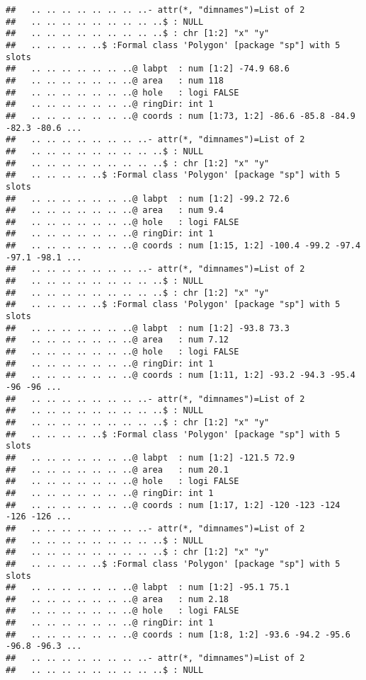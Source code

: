 \documentclass[]{article}
\begin{document}
\begin{verbatim}
##   .. .. .. .. .. .. .. ..- attr(*, "dimnames")=List of 2
##   .. .. .. .. .. .. .. .. ..$ : NULL
##   .. .. .. .. .. .. .. .. ..$ : chr [1:2] "x" "y"
##   .. .. .. .. ..$ :Formal class 'Polygon' [package "sp"] with 5 slots
##   .. .. .. .. .. .. ..@ labpt  : num [1:2] -74.9 68.6
##   .. .. .. .. .. .. ..@ area   : num 118
##   .. .. .. .. .. .. ..@ hole   : logi FALSE
##   .. .. .. .. .. .. ..@ ringDir: int 1
##   .. .. .. .. .. .. ..@ coords : num [1:73, 1:2] -86.6 -85.8 -84.9 -82.3 -80.6 ...
##   .. .. .. .. .. .. .. ..- attr(*, "dimnames")=List of 2
##   .. .. .. .. .. .. .. .. ..$ : NULL
##   .. .. .. .. .. .. .. .. ..$ : chr [1:2] "x" "y"
##   .. .. .. .. ..$ :Formal class 'Polygon' [package "sp"] with 5 slots
##   .. .. .. .. .. .. ..@ labpt  : num [1:2] -99.2 72.6
##   .. .. .. .. .. .. ..@ area   : num 9.4
##   .. .. .. .. .. .. ..@ hole   : logi FALSE
##   .. .. .. .. .. .. ..@ ringDir: int 1
##   .. .. .. .. .. .. ..@ coords : num [1:15, 1:2] -100.4 -99.2 -97.4 -97.1 -98.1 ...
##   .. .. .. .. .. .. .. ..- attr(*, "dimnames")=List of 2
##   .. .. .. .. .. .. .. .. ..$ : NULL
##   .. .. .. .. .. .. .. .. ..$ : chr [1:2] "x" "y"
##   .. .. .. .. ..$ :Formal class 'Polygon' [package "sp"] with 5 slots
##   .. .. .. .. .. .. ..@ labpt  : num [1:2] -93.8 73.3
##   .. .. .. .. .. .. ..@ area   : num 7.12
##   .. .. .. .. .. .. ..@ hole   : logi FALSE
##   .. .. .. .. .. .. ..@ ringDir: int 1
##   .. .. .. .. .. .. ..@ coords : num [1:11, 1:2] -93.2 -94.3 -95.4 -96 -96 ...
##   .. .. .. .. .. .. .. ..- attr(*, "dimnames")=List of 2
##   .. .. .. .. .. .. .. .. ..$ : NULL
##   .. .. .. .. .. .. .. .. ..$ : chr [1:2] "x" "y"
##   .. .. .. .. ..$ :Formal class 'Polygon' [package "sp"] with 5 slots
##   .. .. .. .. .. .. ..@ labpt  : num [1:2] -121.5 72.9
##   .. .. .. .. .. .. ..@ area   : num 20.1
##   .. .. .. .. .. .. ..@ hole   : logi FALSE
##   .. .. .. .. .. .. ..@ ringDir: int 1
##   .. .. .. .. .. .. ..@ coords : num [1:17, 1:2] -120 -123 -124 -126 -126 ...
##   .. .. .. .. .. .. .. ..- attr(*, "dimnames")=List of 2
##   .. .. .. .. .. .. .. .. ..$ : NULL
##   .. .. .. .. .. .. .. .. ..$ : chr [1:2] "x" "y"
##   .. .. .. .. ..$ :Formal class 'Polygon' [package "sp"] with 5 slots
##   .. .. .. .. .. .. ..@ labpt  : num [1:2] -95.1 75.1
##   .. .. .. .. .. .. ..@ area   : num 2.18
##   .. .. .. .. .. .. ..@ hole   : logi FALSE
##   .. .. .. .. .. .. ..@ ringDir: int 1
##   .. .. .. .. .. .. ..@ coords : num [1:8, 1:2] -93.6 -94.2 -95.6 -96.8 -96.3 ...
##   .. .. .. .. .. .. .. ..- attr(*, "dimnames")=List of 2
##   .. .. .. .. .. .. .. .. ..$ : NULL

\end{verbatim}
\end{document}
